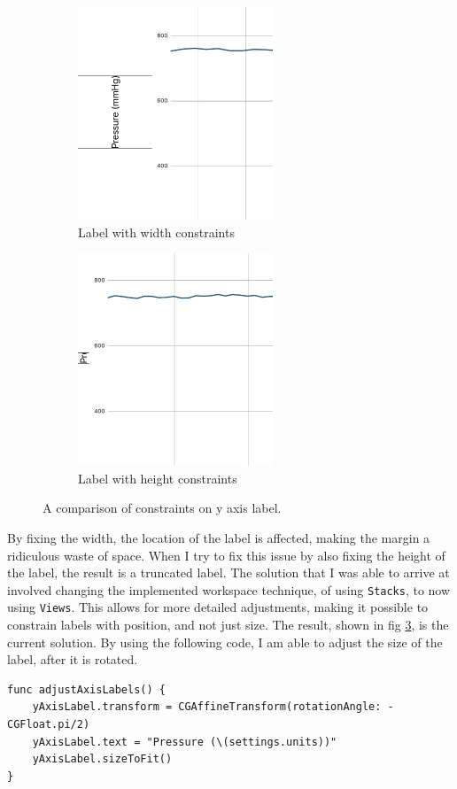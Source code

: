 \documentclass[onecolumn, draftclsnofoot,10pt, compsoc]{IEEEtran}
\begin{document}
\begin{figure}[H]
\centering
\begin{subfigure}{.5\textwidth}
  \centering
  \includegraphics[width=.4\linewidth]{widthAxis}
  \caption{Label with width constraints}
  \label{fig:width}
\end{subfigure}%
\begin{subfigure}{.5\textwidth}
  \centering
  \includegraphics[width=.4\linewidth]{heightAxis}
  \caption{Label with height constraints}
  \label{fig:height}
\end{subfigure}
\caption{A comparison of constraints on y axis label.}
\label{fig:comparison}
\end{figure}

By fixing the width, the location of the label is affected, making the margin a ridiculous waste of space.
When I try to fix this issue by also fixing the height of the label, the result is a truncated label.
The solution that I was able to arrive at involved changing the implemented workspace technique, of using \texttt{Stacks}, to now using \texttt{Views}.
This allows for more detailed adjustments, making it possible to constrain labels with position, and not just size.
The result, shown in fig \ref{fig:comparison}, is the current solution.
By using the following code, I am able to adjust the size of the label, after it is rotated.

\begin{lstlisting}
func adjustAxisLabels() {
    yAxisLabel.transform = CGAffineTransform(rotationAngle: -CGFloat.pi/2)
    yAxisLabel.text = "Pressure (\(settings.units))"
    yAxisLabel.sizeToFit()
}
\end{lstlisting}
\end{document}
